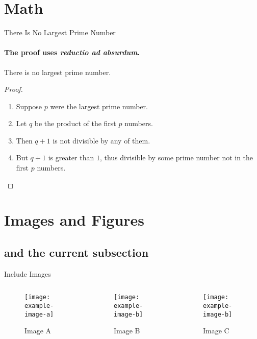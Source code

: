 \documentclass[]{beamer}
\begin{document}
\section{Math}
\rptusectionpage

\begin{frame}{There Is No Largest Prime Number}
\framesubtitle{The proof uses \textit{reductio ad absurdum}.} 
\begin{theorem}
There is no largest prime number. \end{theorem} 

\pause
\begin{proof}
	\begin{enumerate} 
\item<2-| alert@2> Suppose $p$ were the largest prime number. 
\item<3-> Let $q$ be the product of the first $p$ numbers. 
\item<3-> Then $q+1$ is not divisible by any of them. 
\item<4-> But $q + 1$ is greater than $1$, thus divisible by some prime
number not in the first $p$ numbers.
\end{enumerate}
\end{proof}
\end{frame}


\section{Images and Figures}
\subsection*{and the current subsection}

\rptusectionpage

\begin{frame}{Include Images}
	\begin{columns}
	\begin{column}{0.3\textwidth}
		\begin{figure}
			\texttt{[image: example-image-a]}
			\caption{Image A}
		\end{figure}
	\end{column}
	\begin{column}{0.3\textwidth}
		\begin{figure}
			\texttt{[image: example-image-b]}
			\caption{Image B}
		\end{figure}
	\end{column}
	\begin{column}{0.3\textwidth}
		\begin{figure}
			\texttt{[image: example-image-b]}
			\caption{Image C}
		\end{figure}
	\end{column}
	\end{columns}

\vspace{1em}
\end{frame}
\end{document}
